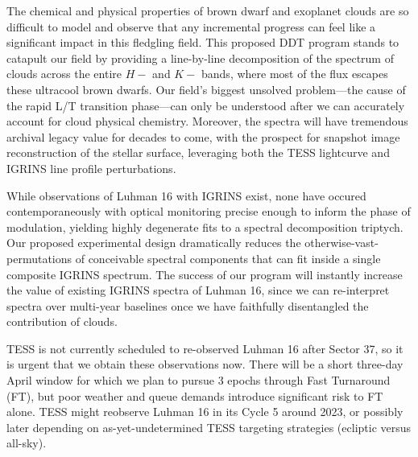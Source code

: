 \documentclass[11pt]{article}
\begin{document}
{The chemical and physical properties of brown dwarf and exoplanet clouds are so difficult to model and observe that any incremental progress can feel like a significant impact in this fledgling field.  This proposed DDT program stands to catapult our field by providing a line-by-line decomposition of the spectrum of clouds across the entire $H-$ and $K-$ bands, where most of the flux escapes these ultracool brown dwarfs.  Our field's biggest unsolved problem---the cause of the rapid L/T transition phase---can only be understood after we can accurately account for cloud physical chemistry.  Moreover, the spectra will have tremendous archival legacy value for decades to come, with the prospect for snapshot image reconstruction of the stellar surface, leveraging both the TESS lightcurve and IGRINS line profile perturbations.



While observations of Luhman 16 with IGRINS exist, none have occured contemporaneously with optical monitoring precise enough to inform the phase of modulation, yielding highly degenerate fits to a spectral decomposition triptych.  Our proposed experimental design dramatically reduces the otherwise-vast-permutations of conceivable spectral components that can fit inside a single composite IGRINS spectrum.  The success of our program will instantly increase the value of existing IGRINS spectra of Luhman 16, since we can re-interpret spectra over multi-year baselines once we have faithfully disentangled the contribution of clouds.  

TESS is not currently scheduled to re-observed Luhman 16 after Sector 37, so it is urgent that we obtain these observations now.  There will be a short three-day April window for which we plan to pursue 3 epochs through Fast Turnaround (FT), but poor weather and queue demands introduce significant risk to FT alone.  TESS might reobserve Luhman 16 in its Cycle 5 around 2023, or possibly later depending on as-yet-undetermined TESS targeting strategies (ecliptic versus all-sky).

}
\end{document}
